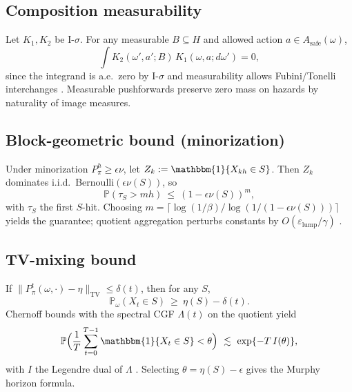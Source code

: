 \documentclass[11pt]{article}
\theoremstyle{plain}
\theoremstyle{definition}
\theoremstyle{remark}
\newcommand{\Prob}{\mathbb{P}}
\newcommand{\1}{\mathbbm{1}}
\newcommand{\TV}{\mathrm{TV}}
\begin{document}
\subsection*{Composition measurability}
Let \(K_1,K_2\) be I-\(\sigma\). For any measurable \(B\subseteq H\) and allowed action \(a\in A_{\mathrm{safe}}(\omega)\),
\[
\int K_2(\omega',a';B)\,K_1(\omega,a;d\omega')=0,
\]
since the integrand is a.e.\ zero by I-\(\sigma\) and measurability allows Fubini/Tonelli interchanges \parencite[Ch.~1]{Bogachev2007}. Measurable pushforwards preserve zero mass on hazards by naturality of image measures.

\subsection*{Block-geometric bound (minorization)}\label{thm:murphyA}
Under minorization \(P_\pi^h\ge \epsilon\nu\), let \(Z_k:=\1\{X_{kh}\in S\}\). Then \(Z_k\) dominates i.i.d.\ Bernoulli\((\epsilon\nu(S))\), so
\[
\Prob(\tau_S>mh)\ \le\ (1-\epsilon\nu(S))^m,
\]
with \(\tau_S\) the first \(S\)-hit. Choosing \(m=\lceil \log(1/\beta)/\log(1/(1-\epsilon\nu(S)))\rceil\) yields the guarantee; quotient aggregation perturbs constants by \(O(\varepsilon_{\mathrm{lump}}/\gamma)\) \parencite{MeynTweedie2009,elliott2025qfi}.

\subsection*{TV-mixing bound}\label{thm:murphyB}
If \(\|P_\pi^t(\omega,\cdot)-\eta\|_{\TV}\le \delta(t)\), then for any \(S\),
\[
\Prob_\omega(X_t\in S)\ \ge\ \eta(S)-\delta(t).
\]
Chernoff bounds with the spectral CGF \(\Lambda(t)\) on the quotient yield
\[
\Prob\Big(\frac{1}{T}\sum_{t=0}^{T-1}\1\{X_t\in S\}<\theta\Big)\ \lesssim\ \exp\{-T\,I(\theta)\},
\]
with \(I\) the Legendre dual of \(\Lambda\) \parencite{LevinPeresWilmer2009,DemboZeitouni1998}. Selecting \(\theta=\eta(S)-\epsilon\) gives the Murphy horizon formula.

\end{document}
